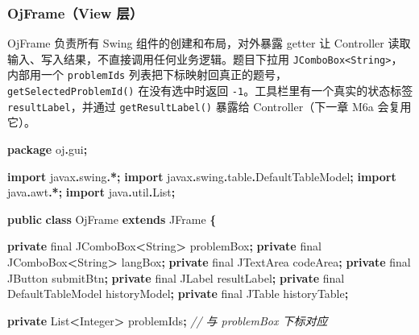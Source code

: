 \documentclass[
  11pt,
]{ctexart}
\newenvironment{Shaded}{\begin{snugshade}}{\end{snugshade}}
\newcommand{\BuiltInTok}[1]{#1}
\newcommand{\CommentTok}[1]{\textcolor[rgb]{0.56,0.35,0.01}{\textit{#1}}}
\newcommand{\DataTypeTok}[1]{\textcolor[rgb]{0.13,0.29,0.53}{#1}}
\newcommand{\ImportTok}[1]{#1}
\newcommand{\KeywordTok}[1]{\textcolor[rgb]{0.13,0.29,0.53}{\textbf{#1}}}
\newcommand{\NormalTok}[1]{#1}
\newcommand{\OperatorTok}[1]{\textcolor[rgb]{0.81,0.36,0.00}{\textbf{#1}}}
\begin{document}
\hypertarget{ojframeview-ux5c42}{%
\subsubsection{OjFrame（View 层）}\label{ojframeview-ux5c42}}

OjFrame 负责所有 Swing 组件的创建和布局，对外暴露 getter 让 Controller
读取输入、写入结果，不直接调用任何业务逻辑。题目下拉用
\texttt{JComboBox\textless{}String\textgreater{}}，内部用一个
\texttt{problemIds}
列表把下标映射回真正的题号，\texttt{getSelectedProblemId()}
在没有选中时返回 \texttt{-1}。工具栏里有一个真实的状态标签
\texttt{resultLabel}，并通过 \texttt{getResultLabel()} 暴露给
Controller（下一章 M6a 会复用它）。

\begin{Shaded}
\begin{Highlighting}[]
\KeywordTok{package}\ImportTok{ oj}\OperatorTok{.}\ImportTok{gui}\OperatorTok{;}

\KeywordTok{import} \ImportTok{javax}\OperatorTok{.}\ImportTok{swing}\OperatorTok{.*;}
\KeywordTok{import} \ImportTok{javax}\OperatorTok{.}\ImportTok{swing}\OperatorTok{.}\ImportTok{table}\OperatorTok{.}\ImportTok{DefaultTableModel}\OperatorTok{;}
\KeywordTok{import} \ImportTok{java}\OperatorTok{.}\ImportTok{awt}\OperatorTok{.*;}
\KeywordTok{import} \ImportTok{java}\OperatorTok{.}\ImportTok{util}\OperatorTok{.}\ImportTok{List}\OperatorTok{;}

\KeywordTok{public} \KeywordTok{class}\NormalTok{ OjFrame }\KeywordTok{extends} \BuiltInTok{JFrame} \OperatorTok{\{}

    \KeywordTok{private} \DataTypeTok{final} \BuiltInTok{JComboBox}\OperatorTok{\textless{}}\BuiltInTok{String}\OperatorTok{\textgreater{}}\NormalTok{ problemBox}\OperatorTok{;}
    \KeywordTok{private} \DataTypeTok{final} \BuiltInTok{JComboBox}\OperatorTok{\textless{}}\BuiltInTok{String}\OperatorTok{\textgreater{}}\NormalTok{ langBox}\OperatorTok{;}
    \KeywordTok{private} \DataTypeTok{final} \BuiltInTok{JTextArea}\NormalTok{ codeArea}\OperatorTok{;}
    \KeywordTok{private} \DataTypeTok{final} \BuiltInTok{JButton}\NormalTok{ submitBtn}\OperatorTok{;}
    \KeywordTok{private} \DataTypeTok{final} \BuiltInTok{JLabel}\NormalTok{ resultLabel}\OperatorTok{;}
    \KeywordTok{private} \DataTypeTok{final} \BuiltInTok{DefaultTableModel}\NormalTok{ historyModel}\OperatorTok{;}
    \KeywordTok{private} \DataTypeTok{final} \BuiltInTok{JTable}\NormalTok{ historyTable}\OperatorTok{;}

    \KeywordTok{private} \BuiltInTok{List}\OperatorTok{\textless{}}\BuiltInTok{Integer}\OperatorTok{\textgreater{}}\NormalTok{ problemIds}\OperatorTok{;}   \CommentTok{// 与 problemBox 下标对应}


\end{Highlighting}
\end{Shaded}
\end{document}
